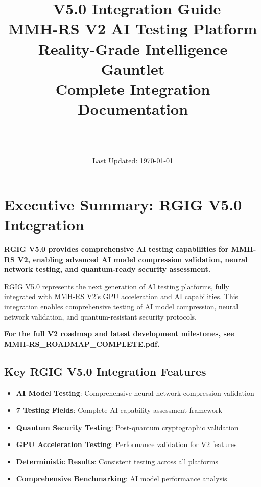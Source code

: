 \documentclass[12pt,a4paper]{article}
\title{\Huge\textbf{\project\ V5.0 Integration Guide}\\[0.5cm]
\Large\textbf{MMH-RS V2 AI Testing Platform}\\[0.3cm]
\large Reality-Grade Intelligence Gauntlet\\[0.5cm]
\large Complete Integration Documentation}
\author{\Large\authorname\\[0.2cm]\email\\[0.2cm]\github}
\date{\large Last Updated: \today}
\begin{document}
\maketitle
\thispagestyle{empty}

\tableofcontents
\newpage

\section{Executive Summary: RGIG V5.0 Integration}

\begin{tcolorbox}[colback=v2blue!10,colframe=v2blue!50,title=\textbf{RGIG V5.0 Integration Summary}]
\textbf{RGIG V5.0 provides comprehensive AI testing capabilities for MMH-RS V2, enabling advanced AI model compression validation, neural network testing, and quantum-ready security assessment.}

RGIG V5.0 represents the next generation of AI testing platforms, fully integrated with MMH-RS V2's GPU acceleration and AI capabilities. This integration enables comprehensive testing of AI model compression, neural network validation, and quantum-resistant security protocols.
\end{tcolorbox}

\textbf{For the full V2 roadmap and latest development milestones, see MMH-RS\_ROADMAP\_COMPLETE.pdf.}

\subsection{Key RGIG V5.0 Integration Features}
\begin{itemize}
    \item \textbf{AI Model Testing}: Comprehensive neural network compression validation
    \item \textbf{7 Testing Fields}: Complete AI capability assessment framework
    \item \textbf{Quantum Security Testing}: Post-quantum cryptographic validation
    \item \textbf{GPU Acceleration Testing}: Performance validation for V2 features
    \item \textbf{Deterministic Results}: Consistent testing across all platforms
    \item \textbf{Comprehensive Benchmarking}: AI model performance analysis
\end{itemize}
\end{document}
